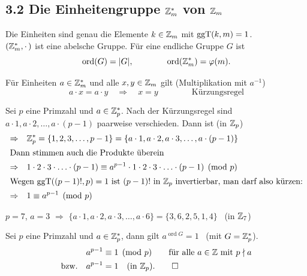 \subsection{3.2 Die Einheitengruppe $\mathbb{Z}_{m}^*$ von $\mathbb{Z}_{m}$}

\begin{bemerkung}
Die Einheiten sind genau die Elemente $k \in \mathbb{Z}_{m}$ mit $\operatorname{ggT}(k, m) = 1$.\\
$(\mathbb{Z}_{m}^*, \cdot\,)$ ist eine abelsche Gruppe. Für eine endliche Gruppe $G$ ist
\[
  \operatorname{ord}(G) = |G|, \qquad\qquad \operatorname{ord}(\mathbb{Z}_{m}^*) = \varphi(m).
\]
\end{bemerkung}

\begin{bemerkung}[Kürzungsregel]
Für Einheiten $a \in \mathbb{Z}_{m}^*$ und alle $x, y \in \mathbb{Z}_{m}$ gilt (Multiplikation mit $a^{-1}$)
\[
  a \cdot x = a \cdot y \quad \Rightarrow \quad x = y \qquad\qquad \text{Kürzungsregel}
\]
\end{bemerkung}

Sei $p$ eine Primzahl und $a \in \mathbb{Z}_{p}^*$. Nach der Kürzungsregel sind $a \cdot 1, a \cdot 2, \ldots, a \cdot (p - 1)$ paarweise verschieden. Dann ist (in $\mathbb{Z}_{p}$)
\begin{align*}
  \Rightarrow\quad & \mathbb{Z}_{p}^* = \{1, 2, 3, \ldots, p - 1\} = \{a \cdot 1, a \cdot 2, a \cdot 3, \ldots, a \cdot (p - 1)\} \\
  \intertext{Dann stimmen auch die Produkte überein}
  \Rightarrow\quad & 1 \cdot 2 \cdot 3 \cdot \ldots \cdot (p - 1) \equiv a^{p-1} \cdot 1 \cdot 2 \cdot 3 \cdot \ldots \cdot (p - 1) \pmod{p} \\
  \intertext{Wegen $\operatorname{ggT}((p - 1)!, p) = 1$ ist $(p - 1)!$ in $\mathbb{Z}_{p}$ invertierbar, man darf also kürzen:}
  \Rightarrow\quad & 1 \equiv a^{p-1} \pmod{p}
\end{align*}

\begin{beispiel}
$p = 7$, $a = 3$ $\Rightarrow$ $\{a \cdot 1, a \cdot 2, a \cdot 3, \ldots, a \cdot 6\} = \{3, 6, 2, 5, 1, 4\}$ \ (in $\mathbb{Z}_{7}$)
\end{beispiel}

\begin{satz}[Fermat]
Sei $p$ eine Primzahl und $a \in \mathbb{Z}_{p}^*$, dann gilt \hfill $a^{\operatorname{ord} G} = 1$ \ (mit $G = \mathbb{Z}_{p}^*$).
\begin{align*}
  & a^{p-1} \equiv 1 \pmod{p} \qquad \text{für alle } a \in \mathbb{Z} \text{ mit } p \nmid a \\
  \text{bzw.}\quad & a^{p-1} = 1 \quad (\text{in } \mathbb{Z}_{p}). \qquad \square
\end{align*}
\end{satz}

